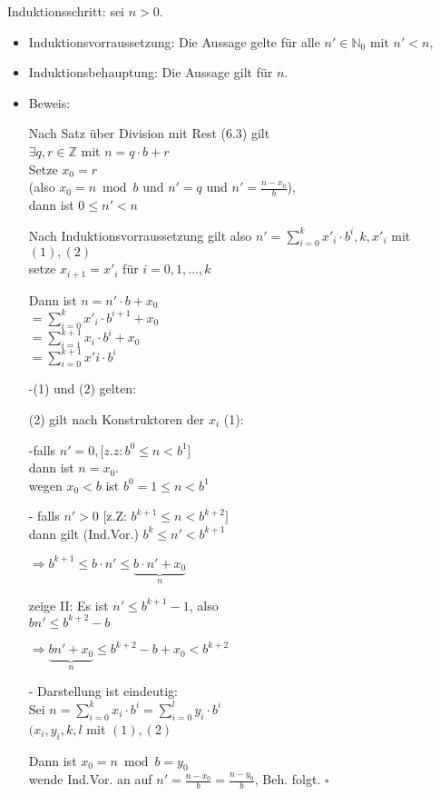 \documentclass[a4paper, 12pt, twoside] {article}
\begin{document}
Induktionsschritt: sei $n > 0$.
\begin{itemize}

\item Induktionsvorraussetzung: Die Aussage gelte für alle $n' \in \mathbb{N}_0$ mit $n' < n$,

\item Induktionsbehauptung: Die Aussage gilt für $n$.


\item Beweis:

Nach Satz über Division mit Rest (6.3) gilt \\
$\exists q, r \in \mathbb{Z}$ mit $n = q \cdot b + r$ \\
Setze $x_0 = r$ \\
(also $x_0 = n \bmod b$ und $n' = q$ und $n' = \frac{n-x_0}{b}$), \\
dann ist $0 \leq n' < n$

Nach Induktionsvorraussetzung gilt also $n' = \displaystyle\sum_{i=0}^k x'_i  \cdot  b^i, k, x'_i$ mit $(1), (2)$ \\
setze $x_{i+1} = x'_i$ für $i = 0, 1, ..., k$

Dann ist $n = n' \cdot b + x_0$ \\
$=\displaystyle\sum_{i=0}^{k} x'_i \cdot b^{i+1} + x_0$ \\
$=\displaystyle\sum_{i=1}^{k+1} x_i  \cdot  b^i + x_0$ \\
$=\displaystyle\sum_{i=0}^{k+1} x'i  \cdot  b^i$

-(1) und (2) gelten:

(2) gilt nach Konstruktoren der $x_i$ \/
(1):

-falls $n' = 0, [z.z: b^0 \leq n < b^1$] \\
dann ist $n = x_0$. \\
wegen $x_0 < b$ ist $b^0 = 1 \leq n < b^1$

- falls $n'>0$ [z.Z: $b^{k+1} \leq n < b^{k+2}]$ \\
dann gilt (Ind.Vor.) $b^k \leq n' < b^{k+1}$

$\Rightarrow b^{k+1} \leq b \cdot n' \leq \underbrace{b \cdot n' + x_0}_{n}$

zeige II: Es ist $n' \leq b^{k+1} - 1$, also \\
$b n' \leq b^{k+2} - b$

$\Rightarrow \underbrace{b n' + x_0}_{n} \leq b^{k+2} - b + x_0 < b^{k+2}$

- Darstellung ist eindeutig: \\
Sei $n = \displaystyle\sum_{i=0}^{k} x_i \cdot  b^i = \displaystyle\sum_{i=0}^{l} y_i  \cdot  b^i$ \\
$(x_i, y_i, k, l$ mit $(1), (2)$

Dann ist $x_0 = n \bmod b = y_0$ \\
wende Ind.Vor. an auf $n' = \frac{n-x_0}{b} = \frac{n-y_0}{b}$, Beh. folgt. \hfill $\square$

\end{itemize}
\end{document}
